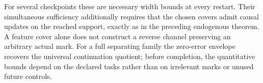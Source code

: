 For several checkpoints these are necessary width bounds at every
restart. Their simultaneous sufficiency additionally requires that
the chosen covers admit causal updates on the reached support, exactly
as in the preceding endogenous theorem. A feature cover alone does
not construct a reverse channel preserving an arbitrary actual mark.
For a full separating family the zero-error envelope recovers the
universal continuation quotient; before completion, the quantitative
bounds depend on the declared tasks rather than on irrelevant marks
or unused future controls.
